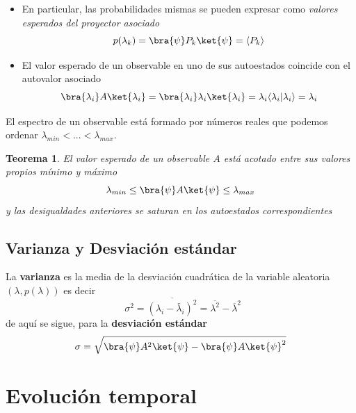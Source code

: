 \documentclass[a4paper,11pt]{book} %
\newtheorem{teorema_contador}{Teorema}
\newcommand{\Teorema}[1]{
		\begin{mybox_gray2}{}
			\begin{teorema_contador}
				 #1 
			\end{teorema_contador} 
		\end{mybox_gray2}
	}
\numberwithin{equation}{chapter}
\newcommand{\braket}[2]{\langle #1|#2\rangle}
\begin{document}
\begin{itemize}
	\item En particular, las probabilidades mismas se pueden expresar como \textit{valores esperados del proyector asociado}
	\begin{equation}
	p(\lambda_k ) =  \bra{\psi}P_k\ket{\psi} = \langle P_k\rangle 
	\end{equation}
	
	\item El valor esperado de un observable en uno de sus autoestados coincide con el autovalor asociado
	\begin{equation}
	\bra{\lambda_i}A \ket{\lambda_i} = \bra{\lambda_i}\lambda_i \ket{\lambda_i}  = \lambda_i \braket{\lambda_i}{\lambda_i} = \lambda_i
	\end{equation}

\end{itemize}

El espectro de un observable está formado por números reales que podemos ordenar $\lambda_{min}<...<\lambda_{max}$.

	\Teorema{
	El valor esperado de un observable $A$ está acotado entre sus valores propios mínimo y máximo
	\begin{equation}
	\lambda_{min} \leq \bra{\psi}A\ket{\psi} \leq \lambda_{max}
	\end{equation}
	y las desigualdades anteriores se saturan en los autoestados correspondientes
	}


		\subsection{Varianza y Desviación estándar}

\begin{mybox_gray2}{}
La \textbf{varianza} es la media de la desviación cuadrática de la variable aleatoria $(\lambda,p(\lambda))$ es decir 
	\begin{equation}
	~~\sigma ^2 = \overline{(\lambda_i-\bar\lambda_i)^2}= \overline{\lambda^2} - \overline{\lambda}^2
	\end{equation}
de aquí se sigue, para la \textbf{desviación estándar}
	\begin{equation}
	\sigma = \sqrt{\bra{\psi}A^2\ket{\psi} - \bra{\psi} A\ket{\psi}^2}
	\end{equation}
\end{mybox_gray2}


	
	\section{Evolución temporal}
\end{document}
